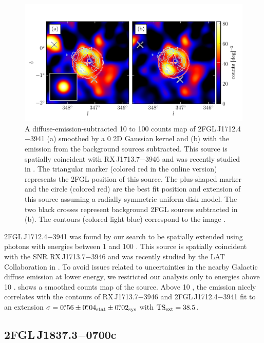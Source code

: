\begin{figure}[htbp]
  \includegraphics{chapters/extended_search/figures/source_plots/source_RX_J1713d7-3946_color.pdf}
  \caption{A diffuse-emission-subtracted 10 \gev to 100 \gev counts map
  of 2FGL\,J1712.4$-$3941 (a) smoothed by a 0 2D Gaussian kernel
  and (b) with the emission from the background sources subtracted.
  This source is spatially coincident with RX\,J1713.7$-$3946 and
  was recently studied in \cite{abdo_2011a_observations-young}.
  The triangular marker (colored red in the online version) represents
  the 2FGL position of this source.  The plus-shaped marker and the
  circle (colored red) are the best fit position and extension of this
  source assuming a radially symmetric uniform disk model.  The two
  black crosses represent background 2FGL sources subtracted in (b).
  The contours (colored light blue) correspond to the \tev image
  \citep{aharonian_2007a_primary-particle}.}
\end{figure}

2FGL\,J1712.4$-$3941 was found by our search to be spatially extended
using photons with energies between 1 \gev and 100 \gev.  This source
is spatially coincident with the SNR RX\,J1713.7$-$3946 and was recently
studied by the LAT Collaboration in \cite{abdo_2011a_observations-young}.
To avoid issues related to uncertainties in the nearby Galactic
diffuse emission at lower energy, we restricted our analysis only
to energies above 10 \gev.   shows a
smoothed counts map of the source. Above 10 \gev, the \gev emission
nicely correlates with the \tev contours of RX\,J1713.7$-$3946
\citep{aharonian_2007a_primary-particle} and 2FGL\,J1712.4$-$3941 fit
to an extension $\sigma=0\mbox{$.\!\!^\circ$}56\pm0\mbox{$.\!\!^\circ$}04_\text{stat}\pm0\mbox{$.\!\!^\circ$}02_\text{sys}$ with
$\mathrm{TS}_\mathrm{ext}=38.5$.

\subsection{2FGL\,J1837.3$-$0700c}

